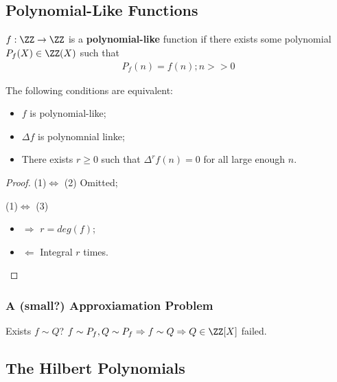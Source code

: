 \documentclass[Total.tex]{subfiles}
\begin{document}
			\subsection{Polynomial-Like Functions}
				\begin{Def}
					$f:\ZZ\rightarrow \ZZ$ is a \textbf{polynomial-like} function if there exists some polynomial $P_f(X)\in \ZZ(X)$ such that
					\begin{gather*}
						P_f(n)=f(n);n>>0
					\end{gather*}
				\end{Def}
				\begin{proposition}
					The following conditions are equivalent:
					\begin{itemize}
						\item $f$ is polynomial-like;
						\item $\Delta f$ is polynomnial linke;
						\item There exists $r\geq 0$ such that $\Delta^r f(n)=0$ for all large enough $n$. 
					\end{itemize}
				\end{proposition}
				\begin{proof}
					(1)$\Leftrightarrow$ (2) Omitted;
					
					(1)$\Leftrightarrow$ (3)
					\begin{itemize}
						\item $\Rightarrow$ $r=deg(f)$;
						\item $\Leftarrow$ Integral $r$ times.
					\end{itemize}
				\end{proof}
					
				\subsubsection{A (small?) Approxiamation Problem} 
				
				Exists $f\sim Q$? $f\sim P_f,Q\sim P_f\Rightarrow f\sim Q\Rightarrow Q\in \ZZ[X]$ failed.
				
			\subsection{The Hilbert Polynomials}
\end{document}
